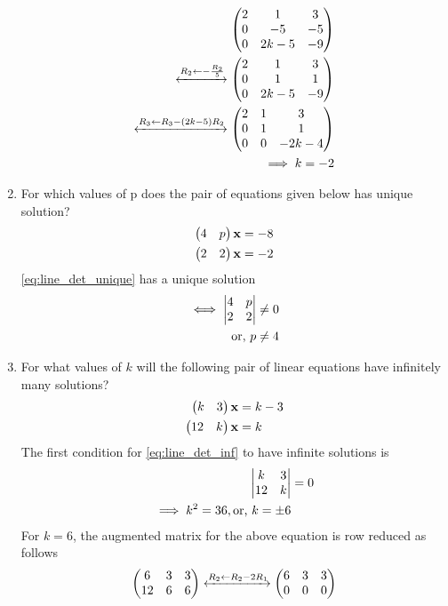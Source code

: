 \documentclass[journal,12pt,twocolumn]{IEEEtran}
\renewcommand\thesection{\arabic{section}}
\begin{document}
\begin{enumerate}[label=\thesection.\arabic*.,ref=\thesection.\theenumi]
\begin{align}
\begin{pmatrix}
2 & 1 & 3
\\
0 & -5 & -5
\\
0 & 2k-5 & -9
\end{pmatrix}
\\
\xleftrightarrow []{R_2\leftarrow -\frac{R_2}{5}}
\begin{pmatrix}
2 & 1 & 3
\\
0 & 1 & 1
\\
0 & 2k-5 & -9
\end{pmatrix}
\\
\xleftrightarrow []{R_3\leftarrow R_3-\ensuremath{\left(2k-5\right)}R_2}
\begin{pmatrix}
2 & 1 & 3
\\
0 & 1 & 1
\\
0 & 0 & -2k-4
\end{pmatrix}
\\
\implies k = -2
\end{align}
\item For which values of p does the pair of equations given below has unique solution?
\begin{align}
\label{eq:line_det_unique}
\begin{split}
\begin{pmatrix}4 & p \end{pmatrix}\mathbf{x}&=-8
\\
\begin{pmatrix}2 & 2 \end{pmatrix}\mathbf{x}&=-2
\end{split}
\end{align}
%
\solution \eqref{eq:line_det_unique} has a unique solution 
\begin{align}
\iff \begin{vmatrix}4 & p \\ 2 & 2\end{vmatrix} \ne 0
\\
\text{or, } p \ne 4
\end{align}
%
\item For what values of $k$ will the following pair of linear equations have infinitely many solutions?
%
\begin{align}
\label{eq:line_det_inf}
\begin{split}
\begin{pmatrix}k & 3 \end{pmatrix}\mathbf{x}&=k-3
\\
\begin{pmatrix}12 & k \end{pmatrix}\mathbf{x}&=k
\end{split}
\end{align}
%
\solution The first condition for \eqref{eq:line_det_inf} to have infinite solutions is 
%
\begin{align}
\label{eq:line_det_inf_cond}
\begin{vmatrix}k & 3 \\12 & k  \end{vmatrix} &= 0
\\
\implies k^2 = 36, \text{or, } k = \pm 6
\end{align}
%
For $k = 6$, 
%
the augmented matrix for the above equation is row reduced as follows
\begin{align}
\myvec{6 & 3 & 3\\12 &  6 & 6} 
\xleftrightarrow {R_2\leftarrow R_2-2R_1}\myvec{6 & 3 & 3\\0 &  0 & 0} 

\end{align}
\end{enumerate}
\end{document}
